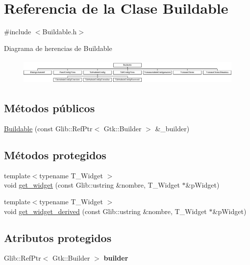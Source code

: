 \hypertarget{classBuildable}{\section{\-Referencia de la \-Clase \-Buildable}
\label{classBuildable}
}


{\ttfamily \#include $<$\-Buildable.\-h$>$}

\-Diagrama de herencias de \-Buildable\begin{figure}[H]
\begin{center}
\leavevmode
\includegraphics[height=1.318681cm]{classBuildable}
\end{center}
\end{figure}
\subsection*{\-Métodos públicos}
\begin{DoxyCompactItemize}
\item 
\hyperlink{classBuildable_a2d8ab7ff5f0b0875154e2bf8354ea16c}{\-Buildable} (const \-Glib\-::\-Ref\-Ptr$<$ \-Gtk\-::\-Builder $>$ \&\-\_\-builder)
\end{DoxyCompactItemize}
\subsection*{\-Métodos protegidos}
\begin{DoxyCompactItemize}
\item 
{\footnotesize template$<$typename T\-\_\-\-Widget $>$ }\\void \hyperlink{classBuildable_a5a7288ca405c8b322afbea651780e775}{get\-\_\-widget} (const \-Glib\-::ustring \&nombre, \-T\-\_\-\-Widget $\ast$\&p\-Widget)
\item 
{\footnotesize template$<$typename T\-\_\-\-Widget $>$ }\\void \hyperlink{classBuildable_a0de0a59fac2e5ea61786221b31b9b974}{get\-\_\-widget\-\_\-derived} (const \-Glib\-::ustring \&nombre, \-T\-\_\-\-Widget $\ast$\&p\-Widget)
\end{DoxyCompactItemize}
\subsection*{\-Atributos protegidos}
\begin{DoxyCompactItemize}
\item 
\hypertarget{classBuildable_ae7f0098739d2ed693d2f1cf8a8842550}{\-Glib\-::\-Ref\-Ptr$<$ \-Gtk\-::\-Builder $>$ {\bfseries builder}}\label{classBuildable_ae7f0098739d2ed693d2f1cf8a8842550}

\end{DoxyCompactItemize}


